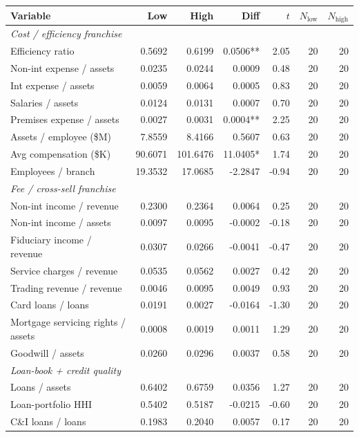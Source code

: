 \begin{tabular}{lrrrrrr}
\toprule
Variable & Low & High & Diff & $t$ & $N_{\text{low}}$ & $N_{\text{high}}$ \\
\midrule
\multicolumn{7}{l}{\emph{Cost / efficiency franchise}} \\
\midrule
Efficiency ratio & 0.5692 & 0.6199 & 0.0506** & 2.05 & 20 & 20 \\
Non-int expense / assets & 0.0235 & 0.0244 & 0.0009 & 0.48 & 20 & 20 \\
Int expense / assets & 0.0059 & 0.0064 & 0.0005 & 0.83 & 20 & 20 \\
Salaries / assets & 0.0124 & 0.0131 & 0.0007 & 0.70 & 20 & 20 \\
Premises expense / assets & 0.0027 & 0.0031 & 0.0004** & 2.25 & 20 & 20 \\
Assets / employee (\$M) & 7.8559 & 8.4166 & 0.5607 & 0.63 & 20 & 20 \\
Avg compensation (\$K) & 90.6071 & 101.6476 & 11.0405* & 1.74 & 20 & 20 \\
Employees / branch & 19.3532 & 17.0685 & -2.2847 & -0.94 & 20 & 20 \\
\midrule
\multicolumn{7}{l}{\emph{Fee / cross-sell franchise}} \\
\midrule
Non-int income / revenue & 0.2300 & 0.2364 & 0.0064 & 0.25 & 20 & 20 \\
Non-int income / assets & 0.0097 & 0.0095 & -0.0002 & -0.18 & 20 & 20 \\
Fiduciary income / revenue & 0.0307 & 0.0266 & -0.0041 & -0.47 & 20 & 20 \\
Service charges / revenue & 0.0535 & 0.0562 & 0.0027 & 0.42 & 20 & 20 \\
Trading revenue / revenue & 0.0046 & 0.0095 & 0.0049 & 0.93 & 20 & 20 \\
Card loans / loans & 0.0191 & 0.0027 & -0.0164 & -1.30 & 20 & 20 \\
Mortgage servicing rights / assets & 0.0008 & 0.0019 & 0.0011 & 1.29 & 20 & 20 \\
Goodwill / assets & 0.0260 & 0.0296 & 0.0037 & 0.58 & 20 & 20 \\
\midrule
\multicolumn{7}{l}{\emph{Loan-book + credit quality}} \\
\midrule
Loans / assets & 0.6402 & 0.6759 & 0.0356 & 1.27 & 20 & 20 \\
Loan-portfolio HHI & 0.5402 & 0.5187 & -0.0215 & -0.60 & 20 & 20 \\
C\&I loans / loans & 0.1983 & 0.2040 & 0.0057 & 0.17 & 20 & 20 \\

\end{tabular}
